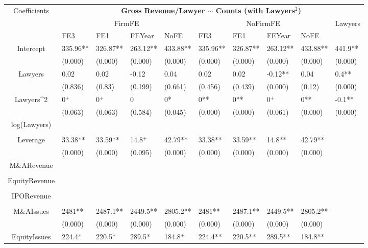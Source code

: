 \documentclass{article}
\begin{document}
\begin{table}[H]
\centering
\begin{tabular}{|clllllllll|}
\hline
\multirow{3}{*}{Coefficients} & \multicolumn{9}{c|}{\textbf{Gross Revenue/Lawyer $\sim$ Counts (with Lawyers$^2$)}} \\
\cline{2-10}
& \multicolumn{4}{c}{FirmFE} & \multicolumn{4}{c}{NoFirmFE} & \multirow{2}{*}{Lawyers} \\
\cline{2-9}
& FE3 & FE1 & FEYear & NoFE & FE3 & FE1 & FEYear & NoFE &  \\
\hline
 
Intercept & 335.96** & 326.87** & 263.12** & 433.88** & 335.96** & 326.87** & 263.12** & 433.88** & 441.9** \\ 
   & (0.000) & (0.000) & (0.000) & (0.000) & (0.000) & (0.000) & (0.000) & (0.000) & (0.000) \\ 
  Lawyers & 0.02 & 0.02 & -0.12 & 0.04 & 0.02 & 0.02 & -0.12** & 0.04 & 0.4** \\ 
   & (0.836) & (0.83) & (0.199) & (0.661) & (0.456) & (0.439) & (0.000) & (0.12) & (0.000) \\ 
  Lawyers^2 & 0$^{+}$ & 0$^{+}$ & 0 & 0* & 0** & 0** & 0$^{+}$ & 0** & -0.1** \\ 
   & (0.063) & (0.063) & (0.584) & (0.045) & (0.000) & (0.000) & (0.061) & (0.000) & (0.000) \\ 
  log(Lawyers) &  &  &  &  &  &  &  &  &  \\ 
   &  &  &  &  &  &  &  &  &  \\ 
  Leverage & 33.38** & 33.59** & 14.8$^{+}$ & 42.79** & 33.38** & 33.59** & 14.8** & 42.79** &  \\ 
   & (0.000) & (0.000) & (0.095) & (0.000) & (0.000) & (0.000) & (0.000) & (0.000) &  \\ 
  M\&ARevenue &  &  &  &  &  &  &  &  &  \\ 
   &  &  &  &  &  &  &  &  &  \\ 
  EquityRevenue &  &  &  &  &  &  &  &  &  \\ 
   &  &  &  &  &  &  &  &  &  \\ 
  IPORevenue &  &  &  &  &  &  &  &  &  \\ 
   &  &  &  &  &  &  &  &  &  \\ 
  M\&AIssues & 2481** & 2487.1** & 2449.5** & 2805.2** & 2481** & 2487.1** & 2449.5** & 2805.2** &  \\ 
   & (0.000) & (0.000) & (0.000) & (0.000) & (0.000) & (0.000) & (0.000) & (0.000) &  \\ 
  EquityIssues & 224.4* & 220.5* & 289.5* & 184.8$^{+}$ & 224.4** & 220.5** & 289.5** & 184.8** &  \\ 

\end{tabular}
\end{table}
\end{document}
